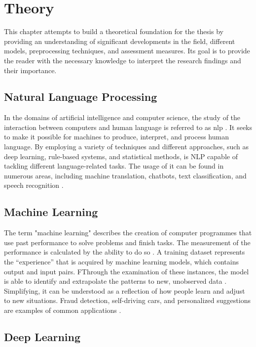 \chapter{Theory}

This chapter attempts to build a theoretical foundation for the thesis by providing an understanding of significant developments in the field, different models, preprocessing techniques, and assessment measures. Its goal is to provide the reader with the necessary knowledge to interpret the research findings and their importance.

\section{Natural Language Processing}

In the domains of artificial intelligence and computer science, the study of the interaction between computers and human language is referred to as \acf{nlp} \citep{helland_tackling_2023}. It seeks to make it possible for machines to produce, interpret, and process human language. By employing a variety of techniques and different approaches, such as deep learning, rule-based systems, and statistical methods, is NLP capable of tackling different language-related tasks. The usage of it can be found in numerous areas, including machine translation, chatbots, text classification, and speech recognition \citep{helland_tackling_2023}.

\section{Machine Learning}

The term "machine learning" describes the creation of computer programmes that use past performance to solve problems and finish tasks. The measurement of the performance is calculated by the ability to do so \citep{helland_tackling_2023}. A training dataset represents the “experience” that is acquired by machine learning models, which contains output and input pairs. FThrough the examination of these instances, the model is able to identify and extrapolate the patterns to new, unobserved data \citep{helland_tackling_2023}. Simplifying, it can be understood as a reflection of how people learn and adjust to new situations. Fraud detection, self-driving cars, and personalized suggestions are examples of common applications \citep{helland_tackling_2023}.

\section{Deep Learning}

